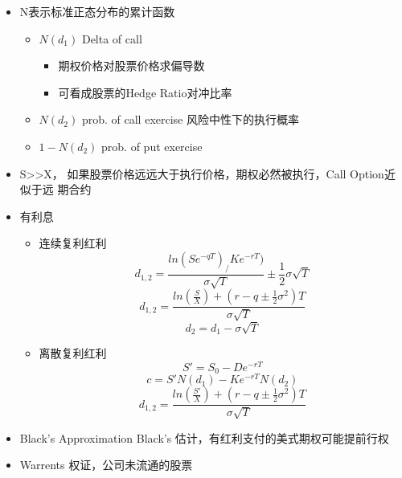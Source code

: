\documentclass[a4paper,6pt,twoside,openany]{article}
\begin{document}
\begin{itemize}
\begin{itemize}
  \item N表示标准正态分布的累计函数
    \begin{itemize}
    \item $N(d_{1})$ Delta of call
      \begin{itemize}
      \item 期权价格对股票价格求偏导数
      \item 可看成股票的Hedge Ratio对冲比率
      \end{itemize}
    \item $N(d_{2})$ prob. of call exercise 风险中性下的执行概率
    \item $1 - N(d_{2})$ prob. of put exercise
    \end{itemize}
  \item S>>X， 如果股票价格远远大于执行价格，期权必然被执行，Call Option近似于远
    期合约
  \item 有利息
    \begin{itemize}
    \item 连续复利红利
      $$d_{1,2} = \frac{ln(Se^{-qT})_/Ke^{-rT})}{\sigma \sqrt{T}} \pm
      \frac{1}{2}\sigma \sqrt{T}$$
      $$d_{1,2}= \frac{ln(\frac{S}{X}) +(r - q \pm
        \frac{1}{2}\sigma^{2})T}{\sigma \sqrt T}$$
      $$d_{2} = d_{1} - \sigma \sqrt{T}$$
    \item 离散复利红利 $$S' = S_{0} - De^{-rT}$$
      $$c=S'N(d_{1}) - Ke^{-rT}N(d_{2})$$
      $$d_{1,2}= \frac{ln(\frac{S'}{X}) +(r - q \pm
        \frac{1}{2}\sigma^{2})T}{\sigma \sqrt T}$$
    \end{itemize}
  \item Black’s Approximation Black's 估计，有红利支付的美式期权可能提前行权
  \item Warrents 权证，公司未流通的股票
  \end{itemize}
\end{itemize}
\end{document}
